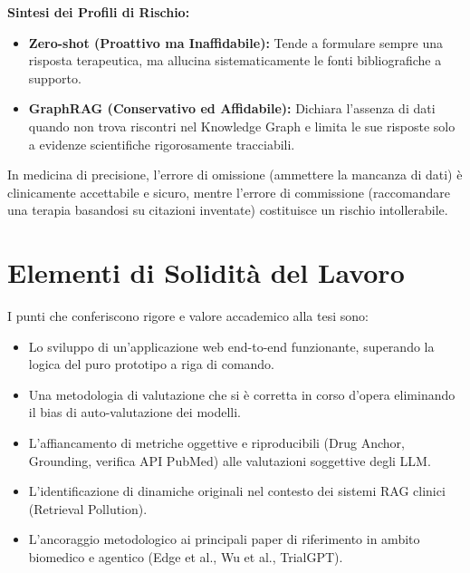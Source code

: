 \documentclass[12pt, a4paper]{article}
\begin{document}
\begin{keyresultbox}
\textbf{Sintesi dei Profili di Rischio:}
\begin{itemize}[leftmargin=1.1em, itemsep=2pt]
  \item \textbf{Zero-shot (Proattivo ma Inaffidabile):} Tende a formulare sempre una risposta terapeutica, ma allucina sistematicamente le fonti bibliografiche a supporto.
  \item \textbf{GraphRAG (Conservativo ed Affidabile):} Dichiara l'assenza di dati quando non trova riscontri nel Knowledge Graph e limita le sue risposte solo a evidenze scientifiche rigorosamente tracciabili.
\end{itemize}
In medicina di precisione, l'errore di omissione (ammettere la mancanza di dati) è clinicamente accettabile e sicuro, mentre l'errore di commissione (raccomandare una terapia basandosi su citazioni inventate) costituisce un rischio intollerabile.
\end{keyresultbox}

\section{Elementi di Solidità del Lavoro}
I punti che conferiscono rigore e valore accademico alla tesi sono:
\begin{itemize}[leftmargin=1.6em, itemsep=2pt]
  \item Lo sviluppo di un'applicazione web end-to-end funzionante, superando la logica del puro prototipo a riga di comando.
  \item Una metodologia di valutazione che si è corretta in corso d'opera eliminando il bias di auto-valutazione dei modelli.
  \item L'affiancamento di metriche oggettive e riproducibili (Drug Anchor, Grounding, verifica API PubMed) alle valutazioni soggettive degli LLM.
  \item L'identificazione di dinamiche originali nel contesto dei sistemi RAG clinici (Retrieval Pollution).
  \item L'ancoraggio metodologico ai principali paper di riferimento in ambito biomedico e agentico (Edge et al., Wu et al., TrialGPT).
\end{itemize}

\end{document}
